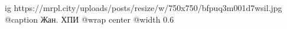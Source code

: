  
 
 
 
 

\ifcmt
  ig https://mrpl.city/uploads/posts/resize/w/750x750/bfpuq3m001d7wsil.jpg
	@caption Жан. ХПИ
  @wrap center
  @width 0.6
\fi

